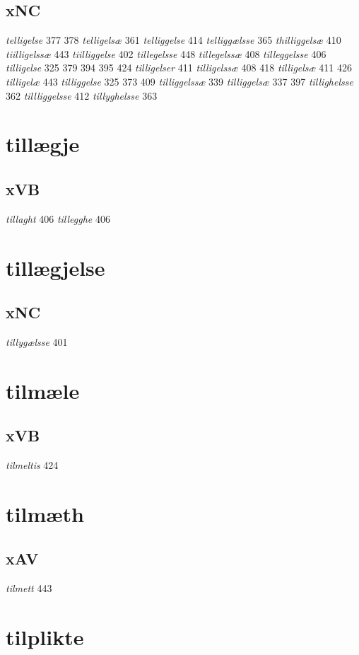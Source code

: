 \documentclass[a4paper,twocolumn]{article}
\begin{document}
\subsection{xNC}
\label{sec:orgfb3c6ef}
\emph{telligelse} 377 378 \emph{telligelsæ} 361 \emph{telliggelse} 414 \emph{telliggælsse} 365 \emph{thilliggelsæ} 410 \emph{tiilligelssæ} 443 \emph{tiilliggelse} 402 \emph{tillegelsse} 448 \emph{tillegelssæ} 408 \emph{tilleggelsse} 406 \emph{tilligelse} 325 379 394 395 424 \emph{tilligelser} 411 \emph{tilligelssæ} 408 418 \emph{tilligelsæ} 411 426 \emph{tilligelæ} 443 \emph{tilliggelse} 325 373 409 \emph{tilliggelssæ} 339 \emph{tilliggelsæ} 337 397 \emph{tillighelsse} 362 \emph{tillliggelsse} 412 \emph{tillyghelsse} 363 
\section{tillægje}
\label{sec:orgab23205}
\subsection{xVB}
\label{sec:org32599ac}
\emph{tillaght} 406 \emph{tillegghe} 406 
\section{tillægjelse}
\label{sec:org1925319}
\subsection{xNC}
\label{sec:org08b6a97}
\emph{tillygælsse} 401 
\section{tilmæle}
\label{sec:org5708aa3}
\subsection{xVB}
\label{sec:orge535474}
\emph{tilmeltis} 424 
\section{tilmæth}
\label{sec:org3bbb5ba}
\subsection{xAV}
\label{sec:org18dac33}
\emph{tilmett} 443 
\section{tilplikte}
\label{sec:orgc5faaac}
\end{document}
